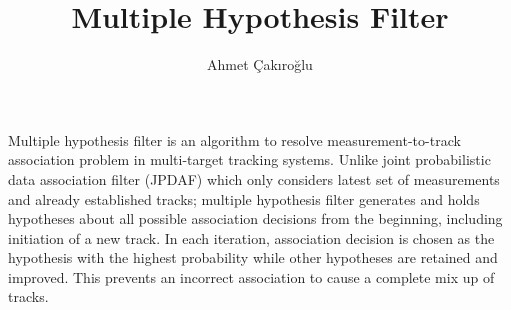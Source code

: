 \documentclass{article}
\title{Multiple Hypothesis Filter}
\author{Ahmet Çakıroğlu}
\date{}
\begin{document}
\maketitle

Multiple hypothesis filter is an algorithm to resolve measurement-to-track association problem in multi-target tracking systems. Unlike joint probabilistic data association filter (JPDAF) which only considers latest set of measurements and already established tracks; multiple hypothesis filter generates and holds hypotheses about all possible association decisions from the beginning, including initiation of a new track. In each iteration, association decision is chosen as the hypothesis with the highest probability while other hypotheses are retained and improved. This prevents an incorrect association to cause a complete mix up of tracks.
\end{document}
